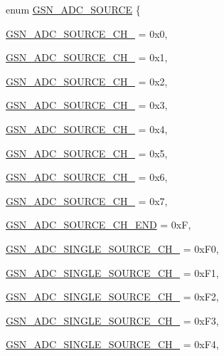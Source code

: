 \begin{DoxyCompactItemize}
enum \hyperlink{a00643_gad3668c4c0f4514808fad4505e4f42900}{GSN\_\-ADC\_\-SOURCE} \{ \par
\hyperlink{a00643_ggad3668c4c0f4514808fad4505e4f42900a94890b29f4c209c4f8377f31532db30b}{GSN\_\-ADC\_\-SOURCE\_\-CH\_} =  0x0, 
\par
\hyperlink{a00643_ggad3668c4c0f4514808fad4505e4f42900a368bd714313cd29ab90c2ebb182d5c12}{GSN\_\-ADC\_\-SOURCE\_\-CH\_} =  0x1, 
\par
\hyperlink{a00643_ggad3668c4c0f4514808fad4505e4f42900a43a2addba7b2659e6f29891f17406afe}{GSN\_\-ADC\_\-SOURCE\_\-CH\_} =  0x2, 
\par
\hyperlink{a00643_ggad3668c4c0f4514808fad4505e4f42900a0ad3e77e9d12c42ee6eae08cbe589636}{GSN\_\-ADC\_\-SOURCE\_\-CH\_} =  0x3, 
\par
\hyperlink{a00643_ggad3668c4c0f4514808fad4505e4f42900ac5aadbacf0fe4844379d6dcfab228b0c}{GSN\_\-ADC\_\-SOURCE\_\-CH\_} =  0x4, 
\par
\hyperlink{a00643_ggad3668c4c0f4514808fad4505e4f42900a5a730c419b93d956a50e9faf80a1d0f3}{GSN\_\-ADC\_\-SOURCE\_\-CH\_} =  0x5, 
\par
\hyperlink{a00643_ggad3668c4c0f4514808fad4505e4f42900acc8ef128dce725e52823e7f47142029a}{GSN\_\-ADC\_\-SOURCE\_\-CH\_} =  0x6, 
\par
\hyperlink{a00643_ggad3668c4c0f4514808fad4505e4f42900a0e5b6484a45d46b6693c5beea0a5765f}{GSN\_\-ADC\_\-SOURCE\_\-CH\_} =  0x7, 
\par
\hyperlink{a00643_ggad3668c4c0f4514808fad4505e4f42900aac0748d6eb68a63f011c31c949bf435f}{GSN\_\-ADC\_\-SOURCE\_\-CH\_\-END} =  0xF, 
\par
\hyperlink{a00643_ggad3668c4c0f4514808fad4505e4f42900a8d23bfcbb9b3d6767c5a5053877e2b04}{GSN\_\-ADC\_\-SINGLE\_\-SOURCE\_\-CH\_} =  0xF0, 
\par
\hyperlink{a00643_ggad3668c4c0f4514808fad4505e4f42900af5680594fe1ad117fb9345552bddb789}{GSN\_\-ADC\_\-SINGLE\_\-SOURCE\_\-CH\_} =  0xF1, 
\par
\hyperlink{a00643_ggad3668c4c0f4514808fad4505e4f42900a43ba07a7aaabaa5303ad12680b5b2349}{GSN\_\-ADC\_\-SINGLE\_\-SOURCE\_\-CH\_} =  0xF2, 
\par
\hyperlink{a00643_ggad3668c4c0f4514808fad4505e4f42900a09aa2a8cf22ad1c2a7f234732c6b8845}{GSN\_\-ADC\_\-SINGLE\_\-SOURCE\_\-CH\_} =  0xF3, 
\par
\hyperlink{a00643_ggad3668c4c0f4514808fad4505e4f42900a7e7d99676c3e1f9ad28ddc2ff46a3c5d}{GSN\_\-ADC\_\-SINGLE\_\-SOURCE\_\-CH\_} =  0xF4, 
\par

\end{DoxyCompactItemize}
